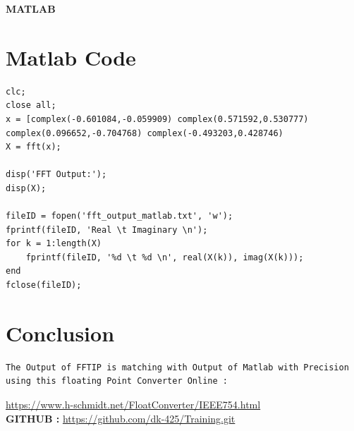 \documentclass{article}
\begin{document}
\maketitle
\hfill \textbf{MATLAB}
\section{Matlab Code}
\begin{lstlisting}
clc;
close all;
x = [complex(-0.601084,-0.059909) complex(0.571592,0.530777) complex(0.096652,-0.704768) complex(-0.493203,0.428746) 
X = fft(x);

disp('FFT Output:');
disp(X);

fileID = fopen('fft_output_matlab.txt', 'w');
fprintf(fileID, 'Real \t Imaginary \n');
for k = 1:length(X)
    fprintf(fileID, '%d \t %d \n', real(X(k)), imag(X(k)));
end
fclose(fileID);

\end{lstlisting}
\vspace{3cm}
\section{Conclusion}
\begin{lstlisting}
The Output of FFTIP is matching with Output of Matlab with Precision 
using this floating Point Converter Online :

\end{lstlisting}
\url{https://www.h-schmidt.net/FloatConverter/IEEE754.html}
\vspace{4cm}
\\
\textbf{GITHUB :} \url{https://github.com/dk-425/Training.git}
\end{document}
